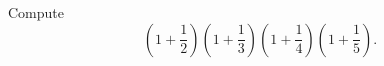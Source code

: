 Compute
\[
\left(1+\dfrac{1}{2}\right)\left(1+\dfrac{1}{3}\right)\left(1+\dfrac{1}{4}\right)\left(1+\dfrac{1}{5}\right).
\]
